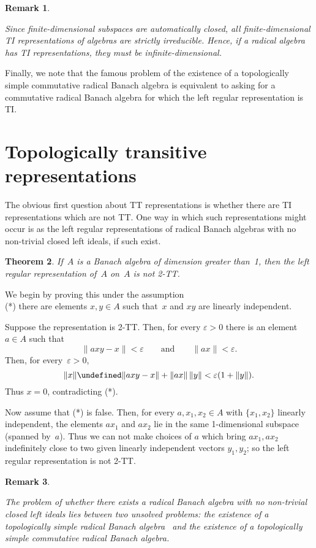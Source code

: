 \documentclass[11pt]{article}
\let\leq\undefined  \let\geq\undefined
\let\le\leq   \let\ge\geq
\newcommand{\e}{\varepsilon}
\newtheorem{thm}{Theorem}[section]
\newenvironment{Proof}{{\it Proof. }}{}%
\newtheorem{remk}[thm]{Remark}
\newenvironment{Remark}{\begin{remk}\begin{rm}}{\end{rm}\end{remk}}
\newcommand{\detail}[1]{}
\begin{document}
\begin{Remark}
Since finite-dimensional subspaces are automatically closed, all
finite-dimensional TI representations of algebras are strictly irreducible.
Hence, if a radical algebra has TI representations, they must be
infinite-dimensional.
\end{Remark}

Finally, we note that the famous problem of the existence of a topologically
simple commutative radical Banach algebra is equivalent to asking for a
commutative radical Banach algebra for which the left regular representation
is TI.
\section{Topologically transitive representations}\label{S4a}

The obvious first question about TT representations is whether there are
TI representations which are not TT.   One way in which such representations
might occur is as the left regular representations of radical Banach algebras
with no non-trivial closed left ideals, if such exist.

\begin{thm}\label{T0}
If~$A$ is a Banach algebra of dimension greater than~1, then the left regular
representation of~$A$ on~$A$ is not 2-TT.
\end{thm}

\begin{Proof}
We begin by proving this under the assumption\\
(*) there are elements $x,y \in A$ such that~$x$ and $xy$ are linearly
independent.

Suppose the representation is 2-TT.  Then, for every
$\e > 0$ there is an element $a \in A$ such that
$$\|axy - x\| < \e\qquad \mbox{and} \qquad \|ax\| < \e.$$
Then, for every~$\e>0$,
$$\|x\| \le \|axy - x\| + \|ax\|\,\|y\| < \e(1+\|y\|).$$
Thus $x=0$, contradicting (*).

Now assume that (*) is false.   Then, for every $a,x_1,x_2 \in A$ with
$\{x_1,x_2\}$ linearly independent, the elements $ax_1$ and $ax_2$ lie in the
same 1-dimensional subspace (spanned by~$a$).  Thus we can not make choices of
$a$ which bring $ax_1, ax_2$ indefinitely close to two given linearly
independent vectors $y_1,y_2$; so the left regular representation is not 2-TT.
\end{Proof}

\begin{Remark}
The problem of whether there exists a radical Banach algebra with no non-trivial
closed left ideals lies between two unsolved problems: the existence of a
topologically simple radical Banach algebra \detail{no non-trivial closed
two-sided ideals}\ and the existence of a topologically simple commutative
radical Banach algebra.  \detail{Might it be equivalent to one of these questions?}
\end{Remark}
\end{document}
